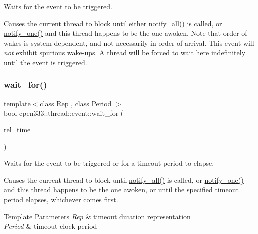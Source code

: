 Waits for the event to be triggered. 

Causes the current thread to block until either {\ttfamily \hyperlink{classcpen333_1_1thread_1_1event_ac41756fc84760cd537c78de31b3b25fa}{notify\+\_\+all()}} is called, or {\ttfamily \hyperlink{classcpen333_1_1thread_1_1event_a453552a68dff5c45321496e452495364}{notify\+\_\+one()}} and this thread happens to be the one awoken. Note that order of wakes is system-\/dependent, and not necessarily in order of arrival. This event will {\itshape not} exhibit spurious wake-\/ups. A thread will be forced to wait here indefinitely until the event is triggered. \mbox{\label{classcpen333_1_1thread_1_1event_a200e1b4dff248be78cc1ae9c993dec02}} 
\subsubsection{\texorpdfstring{wait\+\_\+for()}{wait\_for()}}
{\footnotesize\ttfamily template$<$class Rep , class Period $>$ \\
bool cpen333\+::thread\+::event\+::wait\+\_\+for (\begin{DoxyParamCaption}\item[{const std\+::chrono\+::duration$<$ Rep, Period $>$ \&}]{rel\+\_\+time }\end{DoxyParamCaption})\hspace{0.3cm}{\ttfamily [inline]}}



Waits for the event to be triggered or for a timeout period to elapse. 

Causes the current thread to block until {\ttfamily \hyperlink{classcpen333_1_1thread_1_1event_ac41756fc84760cd537c78de31b3b25fa}{notify\+\_\+all()}} is called, or {\ttfamily \hyperlink{classcpen333_1_1thread_1_1event_a453552a68dff5c45321496e452495364}{notify\+\_\+one()}} and this thread happens to be the one awoken, or until the specified timeout period elapses, whichever comes first. 
\begin{DoxyTemplParams}{Template Parameters}
{\em Rep} & timeout duration representation \\
\hline
{\em Period} & timeout clock period \\
\hline
\end{DoxyTemplParams}

